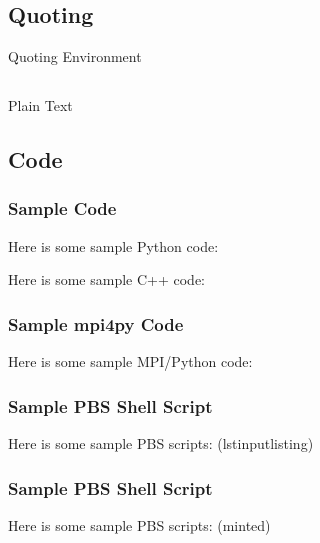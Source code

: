 \documentclass[aspectratio=1610]{beamer}
\begin{document}
\subsection{Quoting}
\begin{frame}{Quoting Environment}
  \lipsum[3]
  \begin{quote}
    \lipsum[4]
  \end{quote}
\end{frame}



\subsection{}
\begin{frame}{Plain Text}
  \lipsum[1]
\end{frame}



\subsection*{Code}
\begin{frame}
  \frametitle{Sample Code}

  Here is some sample Python code:
  

  Here is some sample C++ code:
  
\end{frame}



\begin{frame}
  \frametitle{Sample mpi4py Code}
  Here is some sample MPI/Python code:
\end{frame}



\begin{frame}%
  \frametitle{Sample PBS Shell Script}
  Here is some sample PBS scripts: (lstinputlisting)
  
\end{frame}
\begin{frame}%
  \frametitle{Sample PBS Shell Script}
  Here is some sample PBS scripts: (minted)
  \inputminted[bgcolor=BackgroundBlue3]{bash}{snippets/PBS/hello_world_PBS.sh}
\end{frame}



\begin{frame}
  \vspace{3em}
  \hspace{1em}\layout{}
\end{frame}
\end{document}
